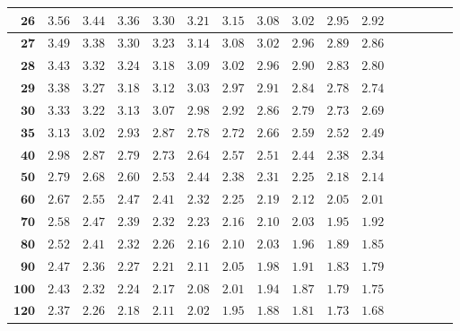\begin{longtable}{|r|r|r|r|r|r|r|r|r|r|r|r|r|r|r|r|}
    \(\mathbf{26}\) & \(3.56\)  & \(3.44\)  & \(3.36\)  & \(3.30\)  & \(3.21\)  & \(3.15\)  & \(3.08\)  & \(3.02\)  & \(2.95\)  & \(2.92\) \\ \hline 
    \(\mathbf{27}\) & \(3.49\)  & \(3.38\)  & \(3.30\)  & \(3.23\)  & \(3.14\)  & \(3.08\)  & \(3.02\)  & \(2.96\)  & \(2.89\)  & \(2.86\) \\ \hline 
    \(\mathbf{28}\) & \(3.43\)  & \(3.32\)  & \(3.24\)  & \(3.18\)  & \(3.09\)  & \(3.02\)  & \(2.96\)  & \(2.90\)  & \(2.83\)  & \(2.80\) \\ \hline 
    \(\mathbf{29}\) & \(3.38\)  & \(3.27\)  & \(3.18\)  & \(3.12\)  & \(3.03\)  & \(2.97\)  & \(2.91\)  & \(2.84\)  & \(2.78\)  & \(2.74\) \\ \hline 
    \(\mathbf{30}\) & \(3.33\)  & \(3.22\)  & \(3.13\)  & \(3.07\)  & \(2.98\)  & \(2.92\)  & \(2.86\)  & \(2.79\)  & \(2.73\)  & \(2.69\) \\ \hline 
    \(\mathbf{35}\) & \(3.13\)  & \(3.02\)  & \(2.93\)  & \(2.87\)  & \(2.78\)  & \(2.72\)  & \(2.66\)  & \(2.59\)  & \(2.52\)  & \(2.49\) \\ \hline 
    \(\mathbf{40}\) & \(2.98\)  & \(2.87\)  & \(2.79\)  & \(2.73\)  & \(2.64\)  & \(2.57\)  & \(2.51\)  & \(2.44\)  & \(2.38\)  & \(2.34\) \\ \hline 
    \(\mathbf{50}\) & \(2.79\)  & \(2.68\)  & \(2.60\)  & \(2.53\)  & \(2.44\)  & \(2.38\)  & \(2.31\)  & \(2.25\)  & \(2.18\)  & \(2.14\) \\ \hline 
    \(\mathbf{60}\) & \(2.67\)  & \(2.55\)  & \(2.47\)  & \(2.41\)  & \(2.32\)  & \(2.25\)  & \(2.19\)  & \(2.12\)  & \(2.05\)  & \(2.01\) \\ \hline 
    \(\mathbf{70}\) & \(2.58\)  & \(2.47\)  & \(2.39\)  & \(2.32\)  & \(2.23\)  & \(2.16\)  & \(2.10\)  & \(2.03\)  & \(1.95\)  & \(1.92\) \\ \hline 
    \(\mathbf{80}\) & \(2.52\)  & \(2.41\)  & \(2.32\)  & \(2.26\)  & \(2.16\)  & \(2.10\)  & \(2.03\)  & \(1.96\)  & \(1.89\)  & \(1.85\) \\ \hline 
    \(\mathbf{90}\) & \(2.47\)  & \(2.36\)  & \(2.27\)  & \(2.21\)  & \(2.11\)  & \(2.05\)  & \(1.98\)  & \(1.91\)  & \(1.83\)  & \(1.79\) \\ \hline 
    \(\mathbf{100}\) & \(2.43\)  & \(2.32\)  & \(2.24\)  & \(2.17\)  & \(2.08\)  & \(2.01\)  & \(1.94\)  & \(1.87\)  & \(1.79\)  & \(1.75\) \\ \hline 
    \(\mathbf{120}\) & \(2.37\)  & \(2.26\)  & \(2.18\)  & \(2.11\)  & \(2.02\)  & \(1.95\)  & \(1.88\)  & \(1.81\)  & \(1.73\)  & \(1.68\) \\ \hline 

\end{longtable}
